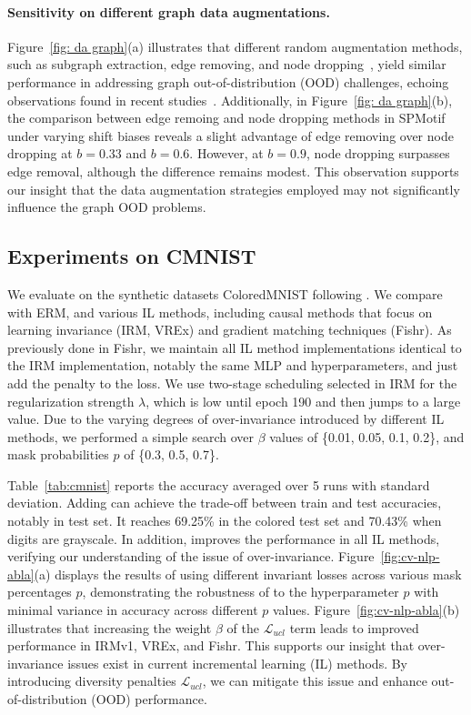 \paragraph{Sensitivity on different graph data augmentations.}
Figure~\ref{fig: da graph}(a) illustrates that different random augmentation methods, such as subgraph extraction, edge removing, and node dropping~\citep{graphCL}, yield similar performance in addressing graph out-of-distribution (OOD) challenges, echoing observations found in recent studies~\citep{GCL_arche}. 
Additionally, in Figure~\ref{fig: da graph}(b), the comparison between edge remoing and node dropping methods in SPMotif under varying shift biases reveals a slight advantage of edge removing over node dropping at $b=0.33$ and $b=0.6$. However, at $b=0.9$, node dropping surpasses edge removal, although the difference remains modest. This observation supports our insight that the data augmentation strategies employed may not significantly influence the graph OOD problems.


\subsection{Experiments on CMNIST}
\label{sec: exp cmnist}
We evaluate \ours on the synthetic datasets ColoredMNIST following \cite{irmv1}.
We compare \ours with ERM, and various IL methods, including causal methods that focus on learning invariance (IRM, VREx) and gradient matching techniques (Fishr).
As previously done in Fishr, we maintain all IL method implementations identical to the IRM implementation, notably the same MLP and hyperparameters, and just add the \ours penalty to the loss.
We use two-stage scheduling selected in IRM for the regularization strength $\lambda$, which is low until epoch 190 and then jumps to a large value. Due to the varying degrees of over-invariance introduced by different IL methods, we performed a simple search over $\beta$ values of \{0.01, 0.05, 0.1, 0.2\}, and mask probabilities $p$ of \{0.3, 0.5, 0.7\}.


Table~\ref{tab:cmnist} reports the accuracy averaged over 5 runs with standard deviation. 
Adding \ours can achieve the trade-off between train and test accuracies, notably in test set. It reaches 69.25\% in the colored test set and 70.43\% when digits are grayscale. 
In addition, \ours improves the performance in all IL methods, verifying our understanding of the issue of over-invariance.
Figure~\ref{fig:cv-nlp-abla}(a) displays the results of \ours using different invariant losses across various mask percentages $p$, demonstrating the robustness of \ours to the hyperparameter $p$ with minimal variance in accuracy across different $p$ values.
Figure~\ref{fig:cv-nlp-abla}(b) illustrates that increasing the weight $\beta$ of the $\mathcal{L}_{ucl}$ term leads to improved performance in IRMv1, VREx, and Fishr. 
This supports our insight that over-invariance issues exist in current incremental learning (IL) methods. 
By introducing diversity penalties $\mathcal{L}_{ucl}$, we can mitigate this issue and enhance out-of-distribution (OOD) performance.


